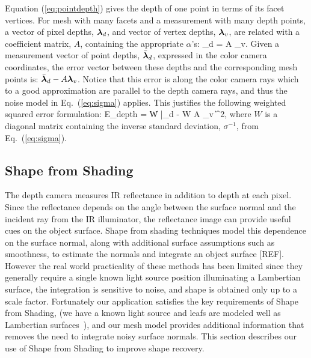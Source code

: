 Equation (\ref{eq:pointdepth}) gives the depth of one point in terms of its facet vertices.  For mesh with many facets and a measurement with many depth points, a vector of pixel depths, $\boldsymbol{\lambda}_d$, and vector of vertex depths, $\boldsymbol{\lambda}_v$, are related with a coefficient matrix, $A$, containing the appropriate $\alpha$'s:
\beq
\vlambda_d = A \vlambda_v. \label{eq:linearmesh}
\eeq
Given a measurement vector of point depths, $\bar{\boldsymbol{\lambda}}_d$, expressed in the color camera coordinates, the error vector between these depths and the corresponding mesh points is: $\bar{\boldsymbol{\lambda}}_d - A \boldsymbol{\lambda}_v$.  Notice that this error is along the color camera rays which to a good approximation are parallel to the depth camera rays, and thus the noise model in Eq.~(\ref{eq:sigma}) applies.  This justifies the following weighted squared error formulation:
\beq
E_{depth} = \| W \bar{\vlambda}_d - W A \vlambda_v \|^2, \label{eq:meshleastsquares}
\eeq
where $W$ is a diagonal matrix containing the inverse standard deviation, $\sigma^{-1}$, from Eq.~(\ref{eq:sigma}).

\subsection{Shape from Shading}

The depth camera measures IR reflectance in addition to depth at each pixel.  Since the reflectance depends on the angle between the surface normal and the incident ray from the IR illuminator, the reflectance image can provide useful cues on the object surface.  Shape from shading techniques model this dependence on the surface normal, along with additional surface assumptions such as smoothness, to estimate the normals and integrate an object surface [REF].  However the real world practicality of these methods has been limited since they generally require a single known light source position illuminating a Lambertian surface, the integration is sensitive to noise, and shape is obtained only up to a scale factor.  Fortunately our application satisfies the key requirements of Shape from Shading, (we have a known light source and leafs are modeled well as Lambertian surfaces~\cite{Chelle2006219}), and our mesh model provides additional information that removes the need to integrate noisy surface normals.  This section describes our use of Shape from Shading to improve shape recovery.

